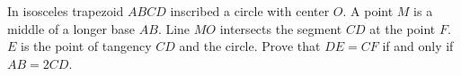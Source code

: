 \problem
In isosceles trapezoid $ABCD$ inscribed a circle with center $O$.
A point $M$ is a middle of a longer base $AB$.
Line $MO$ intersects the segment $CD$ at the point $F$.
$E$ is the point of tangency $CD$ and the circle.
Prove that $DE = CF$ if and only if $AB = 2 CD$.
\solution
\endproblem
